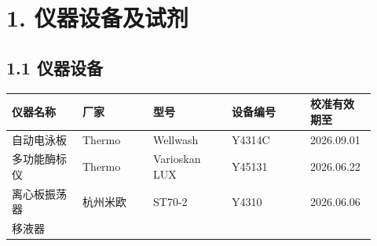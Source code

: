 \documentclass[UTF8,10pt,a4paper,fontset=fandol]{ctexart}
\newcommand{\fieldvalue}[1]{#1}
\newcommand{\handwritten}[1]{#1}
\begin{document}
\section*{1. 仪器设备及试剂}

\subsection*{1.1 仪器设备}

\begin{center}
\small
\begin{tabular}{|p{0.18\linewidth}|p{0.18\linewidth}|p{0.20\linewidth}|p{0.20\linewidth}|p{0.16\linewidth}|}
\hline
仪器名称 & 厂家 & 型号 & 设备编号 & 校准有效期至\\
\hline
\fieldvalue{自动电泳板} &
\fieldvalue{Thermo} &
\fieldvalue{Wellwash} &
\fieldvalue{\handwritten{Y4314C}} &
\fieldvalue{\handwritten{2026.09.01}}\\
\hline
\fieldvalue{多功能酶标仪} &
\fieldvalue{Thermo} &
\fieldvalue{Vari­oskan LUX} &
\fieldvalue{\handwritten{Y45131}} &
\fieldvalue{\handwritten{2026.06.22}}\\
\hline
\fieldvalue{离心板振荡器} &
\fieldvalue{杭州米欧} &
\fieldvalue{ST70-2} &
\fieldvalue{\handwritten{Y4310}} &
\fieldvalue{\handwritten{2026.06.06}}\\
\hline
\multirow{3}{*}{%
\fieldvalue{移液器}} &
\multirow{3}{*}{%
}
\end{tabular}
\end{center}
\end{document}
